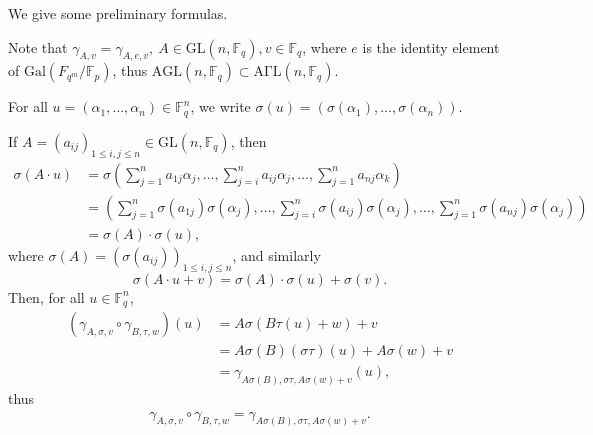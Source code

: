 \documentclass[11pt,a4paper]{article}
\newcommand{\F}{\mathbb{F}}
\newcommand{\Gal}{\mathrm{Gal}}
\begin{document}
 \bigskip
 
 We give some preliminary formulas.
 
Note that $\gamma_{A,v} = \gamma_{A,e,v}, \ A \in \mathrm{GL}(n,\F_q), v \in \F_q$, where $e$ is the identity element of $\Gal(F_{q^m}/\F_p)$, thus $\mathrm{AGL}(n,\F_q) \subset \mathrm{A\Gamma L}(n,\F_q)$.

For all $u = (\alpha_1,\ldots,\alpha_n) \in \F_q^n$, we write $\sigma(u) = (\sigma(\alpha_1),\ldots,\sigma(\alpha_n))$. 

If $A =(a_{ij})_{1\leq i,j \leq n} \in \mathrm{GL}(n,\F_q)$, then 
\begin{align*}
\sigma(A\cdot u) &= \sigma\left(\sum_{j=1}^n a_{1j} \alpha_j,\ldots,\sum_{j=i}^n a_{ij} \alpha_j,\ldots,\sum_{j=1}^n a_{nj} \alpha_k\right)\\
&=\left(\sum_{j=1}^n \sigma(a_{1j}) \sigma(\alpha_j),\ldots,\sum_{j=i}^n \sigma(a_{ij})\sigma( \alpha_j),\ldots,\sum_{j=1}^n \sigma(a_{nj})\sigma( \alpha_j)\right)\\
&=\sigma(A)\cdot \sigma(u),
\end{align*}
where $\sigma(A) = (\sigma(a_{ij}))_{1\leq i,j \leq n}$, and similarly 
$$\sigma(A\cdot u + v) = \sigma(A)\cdot  \sigma(u) + \sigma(v).$$
Then, for all $u \in \F_q^n$,
\begin{align*}
(\gamma_{A,\sigma,v} \circ \gamma_{B,\tau,w})(u) &= A\sigma(B\tau(u)+w) + v\\
&=A\sigma(B) (\sigma\tau)(u) + A\sigma(w) + v\\
&=\gamma_{A\sigma(B),\sigma \tau,A \sigma(w) + v}(u),
\end{align*}
thus
\begin{align}
\gamma_{A,\sigma,v} \circ \gamma_{B,\tau,w} = \gamma_{A\sigma(B),\sigma \tau,A \sigma(w) + v}.
\end{align}
\end{document}
